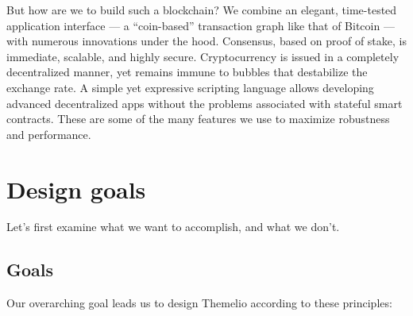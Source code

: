 \documentclass[headinclude,12pt]{scrbook}
\begin{document}
But how are we to build such a blockchain? We combine an elegant, time-tested application interface --- a ``coin-based'' transaction graph like that of Bitcoin --- with numerous innovations under the hood. Consensus, based on proof of stake, is immediate, scalable, and highly secure. Cryptocurrency is issued in a completely decentralized manner, yet remains immune to bubbles that destabilize the exchange rate. A simple yet expressive scripting language allows developing advanced decentralized apps without the problems associated with stateful smart contracts. These are some of the many features we use to maximize robustness and performance.

\section{Design goals}

Let's first examine what we want to accomplish, and what we don't.

\subsection{Goals}

Our overarching goal leads us to design Themelio according to these principles:
\end{document}
